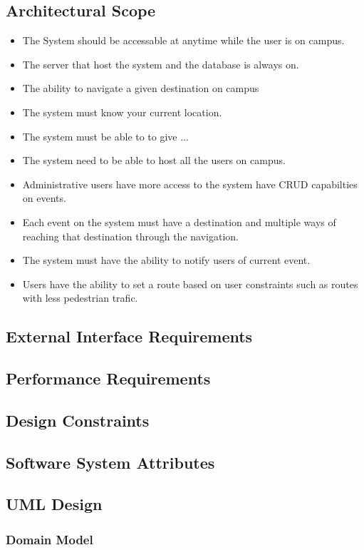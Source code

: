 \documentclass[a4paper,12pt]{report}
\begin{document}
\subsection{Architectural Scope}
\begin{itemize}
	\item The System should be accessable at anytime while the user is on campus.
	\item The server that host the system and the database is always on.
	\item The ability to navigate a given destination on campus
	\item The system must know your current location.
	\item The system must be able to to give ...
	\item The system need to be able to host all the users on campus.
	\item Administrative users have more access to the system have CRUD capabilties on events.
	\item Each event on the system must have a destination and multiple ways of reaching that destination through the navigation.
	\item The system must have the ability to notify users of current event.
	\item Users have the ability to set a route based on user constraints such as routes with less pedestrian trafic. 
\end{itemize}
\newpage
\subsection{External Interface Requirements}
\newpage
\subsection{Performance Requirements}
\newpage
\subsection{Design Constraints}
\newpage
\subsection{Software System Attributes}
\newpage
\subsection{UML Design}
\subsubsection{Domain Model}
\end{document}
